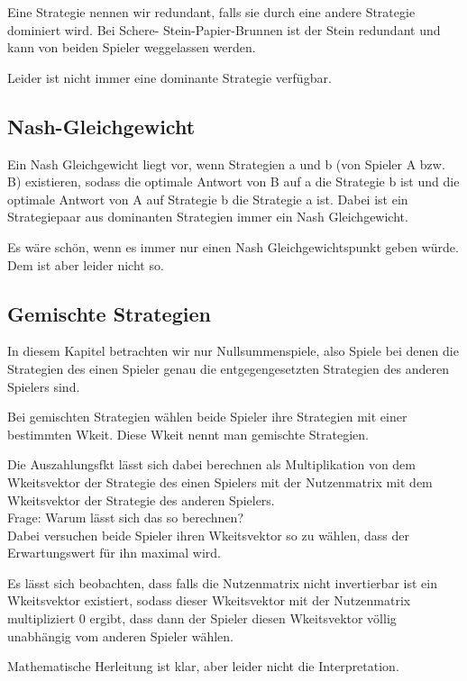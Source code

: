 \documentclass[]{article}
\begin{document}
Eine Strategie nennen wir redundant, falls sie durch eine andere Strategie dominiert wird. Bei Schere- Stein-Papier-Brunnen ist der Stein redundant und kann von beiden Spieler weggelassen werden. 

Leider ist nicht immer eine dominante Strategie verfügbar. 

\subsection{Nash-Gleichgewicht}

Ein Nash Gleichgewicht liegt vor, wenn Strategien a und b (von Spieler A bzw. B) existieren, sodass die optimale Antwort von B auf a die Strategie b ist und die optimale Antwort von A auf Strategie b die Strategie a ist. Dabei ist ein Strategiepaar aus dominanten Strategien immer ein Nash Gleichgewicht. 

Es wäre schön, wenn es immer nur einen Nash Gleichgewichtspunkt geben würde. Dem ist aber leider nicht so.

\subsection{Gemischte Strategien}
In diesem Kapitel betrachten wir nur Nullsummenspiele, also Spiele bei denen die Strategien des einen Spieler genau die entgegengesetzten Strategien des anderen Spielers sind. 

Bei gemischten Strategien wählen beide Spieler ihre Strategien mit einer bestimmten Wkeit. Diese Wkeit nennt man gemischte Strategien. 

Die Auszahlungsfkt lässt sich dabei berechnen als Multiplikation von dem Wkeitsvektor der Strategie des einen Spielers mit der Nutzenmatrix mit dem Wkeitsvektor der Strategie des anderen Spielers. \\

Frage: Warum lässt sich das so berechnen? \\ 

Dabei versuchen beide Spieler ihren Wkeitsvektor so zu wählen, dass der Erwartungswert für ihn maximal wird.

Es lässt sich beobachten, dass falls die Nutzenmatrix nicht invertierbar ist ein Wkeitsvektor existiert, sodass dieser Wkeitsvektor mit der Nutzenmatrix multipliziert 0 ergibt, dass dann der Spieler diesen Wkeitsvektor völlig unabhängig vom anderen Spieler wählen. 

Mathematische Herleitung ist klar, aber leider nicht die Interpretation. 
  
\end{document}
